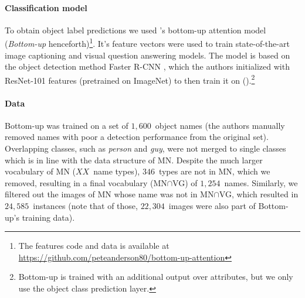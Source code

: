 \paragraph{Classification model}
To obtain object label predictions we used \citeauthor{anderson2018updown}'s \citeyear{anderson2018updown} bottom-up attention model (\textit{Bottom-up} henceforth)\footnote{The features code and data is available at \url{https://github.com/peteanderson80/bottom-up-attention}}. 
It's feature vectors were used to train state-of-the-art image captioning and visual question answering models. 
The model is based on the object detection method Faster R-CNN \cite{fasterrcnn2015}, which the authors  initialized with ResNet-101 \cite{he2016deep} features (pretrained on ImageNet) to then train it on \vgenome (\vg).\footnote{Bottom-up is trained with an additional output over attributes, but we only use the object class prediction layer.} 
%
\iffalse
"To pretrain the bottom-up attention model, we first initialize Faster R-CNN with ResNet-101 pretrained for classification on ImageNet [35]. We then train on Visual
Genome [21] data. To aid the learning of good feature
representations, we add an additional training output for
predicting attribute classes (in addition to object classes).
To predict attributes for region i, we concatenate the mean
pooled convolutional feature vi with a learned embedding
of the ground-truth object class, and feed this into an additional output layer defining a softmax distribution over each
attribute class plus a ‘no attributes’ class.
The original Faster R-CNN multi-task loss function contains four components, defined over the classification and
bounding box regression outputs for both the RPN and the
final object class proposals respectively. We retain these
components and add an additional multi-class loss component to train the attribute predictor"
\fi

\paragraph{Data}
Bottom-up was trained on a set of $1,600$\ object names (the authors manually removed names with poor a detection performance from the original set). 
Overlapping classes, such as \textsl{person} and \textsl{guy}, were not merged to single classes which is in line with the data structure of MN. 
Despite the much larger vocabulary of MN ($XX$\ name types), $346$~types are not in MN, which we removed, resulting in a final vocabulary (\mbox{MN$\cap$VG}) of $1,254$~names. 
Similarly, we filtered out the images of MN whose \vg name was not in \mbox{MN$\cap$VG}, which resulted in $24,585$~instances (note that of those, $22,304$~images were also part of Bottom-up's training data). 


